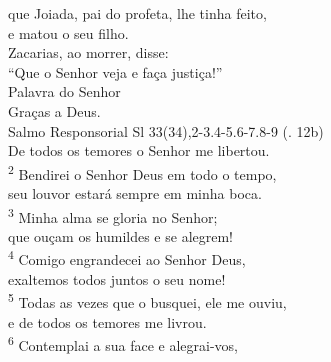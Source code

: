 \documentclass{book}
\begin{document}
\begin{flushleft}
    que Joiada, pai do profeta, lhe tinha feito,\\
    e matou o seu filho.\\
    Zacarias, ao morrer, disse:\\
    ``Que o Senhor veja e faça justiça!''
    \vspace{.1cm}\\
    Palavra do Senhor\\
    \RbarRed{} Graças a Deus.
    \vspace{.2cm} \\
    \textcolor{VioletRed1}{Salmo Responsorial
        \hspace{\fill} Sl 33(34),2-3.4-5.6-7.8-9}   {\color{VioletRed1} (\Rbar. 12b)}
    \vspace{.1cm}\\
    \RbarRed{} De todos os temores o Senhor me libertou.
    \hspace{\fill}
    \vspace{.1cm} \\
    \textsuperscript{\underline{\hspace{.07in}}\textcolor{VioletRed1}{2}} Bendirei o Senhor Deus em todo o tempo, \textsuperscript{\gresixstar{}}\\
    seu louvor estará sempre em minha boca.\\
    \textsuperscript{\underline{\hspace{.07in}}\textcolor{VioletRed1}{3}} Minha alma se gloria no Senhor; \textsuperscript{\gresixstar{}}\\
    que ouçam os humildes e se alegrem!
    \hspace{\fill}\RbarRed{}
    \vspace{.1cm}\\
    \textsuperscript{\underline{\hspace{.07in}}\textcolor{VioletRed1}{4}} Comigo engrandecei ao Senhor Deus, \textsuperscript{\gresixstar{}}\\
    exaltemos todos juntos o seu nome!\\
    \textsuperscript{\underline{\hspace{.07in}}\textcolor{VioletRed1}{5}} Todas as vezes que o busquei, ele me ouviu, \textsuperscript{\gresixstar{}}\\
    e de todos os temores me livrou.
    \hspace{\fill}\RbarRed{}
    \vspace{.1cm}\\
    \textsuperscript{\underline{\hspace{.07in}}\textcolor{VioletRed1}{6}} Contemplai a sua face e alegrai-vos, \textsuperscript{\gresixstar{}}\\

\end{flushleft}
\end{document}
